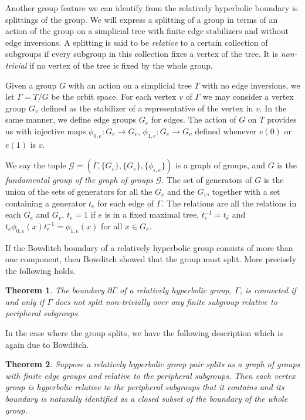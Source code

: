 \documentclass[11pt]{article}
\newtheorem{theorem}{Theorem}[section]
\theoremstyle{definition}
\begin{document}
Another group feature we can identify from the relatively hyperbolic boundary is splittings of the group. We will express a splitting of a group in terms of an action of the group on a simplicial tree with finite edge stabilizers and without edge inversions.
A splitting is said to be {\it relative}
to a certain collection of subgroups if every subgroup in this collection
fixes a vertex of the tree. It is {\it non-trivial} if no vertex of the tree is
fixed by the whole group. 

Given a group $G$ with an action on a simplicial tree $T$ with no edge inversions, we let $\Gamma=T/G$ be the orbit space. For each vertex $v$ of $\Gamma$ we may consider  a vertex group $G_v$  defined
as the stabilizer of a representative of the vertex in $v$. In the same manner, we define edge groups $G_e$ for edges. The action of $G$ on $T$ provides us with 
 injective maps $\phi_{0,e}: G_e \rightarrow G_v$, $\phi_{1,e}:G_e \rightarrow G_v$  defined whenever $e(0)$ or $e(1)$ is  $v$.
 
 We say the tuple $\mathcal{G}= (\Gamma, \lbrace G_v \rbrace, \lbrace G_e \rbrace, \lbrace \phi_{\epsilon, e} \rbrace)$ is a graph of groups, and $G$ is
  the {\it fundamental group of the graph of groups} $\mathcal{G}$. The set of generators of $G$ is the union of the sets of generators for all the $G_e$ and the $G_v$, together with a set containing a generator $t_e$ for each edge of $\Gamma$. The relations are all the relations in each $G_e$ and $G_v$, $t_e = 1$ if $e$ is in a fixed maximal tree, $t_e^{-1} = t_{\bar e}$ and $t_e \phi_{0,e}(x) t_e^{-1} = \phi_{1,e}(x)$ for all $x \in G_e$.


  \bigskip
  
If the Bowditch boundary of a relatively hyperbolic group consists of more than one component, then Bowditch showed that the group must split. More precisely the following holds.

\begin{theorem}\cite[Theorem 10.1]{bowrelhyp} \label{thm:bow10.1}
The boundary $\partial \Gamma$  of a relatively hyperbolic group, $\Gamma$, is connected if and only if $\Gamma$ does not split non-trivially over any finite subgroup relative to peripheral subgroups. \end{theorem} 

In the case where the group splits, we have the following description which is again due to Bowditch. 

\begin{theorem} \cite[Theorem 10.3]{bowrelhyp} \label{thm:bow10.3}
Suppose a relatively hyperbolic group pair splits as a graph of groups with finite edge groups and relative to the peripheral subgroups. Then each vertex group is hyperbolic relative to the peripheral subgroups that it contains
and its boundary  is naturally identified as a closed subset of the boundary of the whole group.\end{theorem} 
\end{document}
